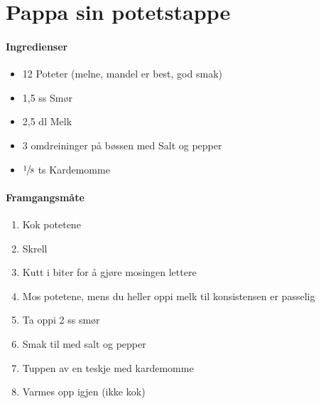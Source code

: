 \section{﻿Pappa sin potetstappe}


\paragraph{Ingredienser}
\begin{itemize}[noitemsep]
	\item 12 Poteter (melne, mandel er best, god smak)
	\item 1,5 ss Smør
	\item 2,5 dl Melk
	\item 3 omdreininger på bøssen med Salt og pepper
	\item $\sfrac{1}{8}$ ts Kardemomme
\end{itemize}

\paragraph{Framgangsmåte}
\begin{enumerate}[noitemsep]
	\item Kok potetene
	\item Skrell
	\item Kutt i biter for å gjøre mosingen lettere
	\item Mos potetene, mens du heller oppi melk til konsistensen er passelig
	\item Ta oppi 2 ss smør
	\item Smak til med salt og pepper
	\item Tuppen av en teskje med kardemomme
	\item Varmes opp igjen (ikke kok)
\end{enumerate}
